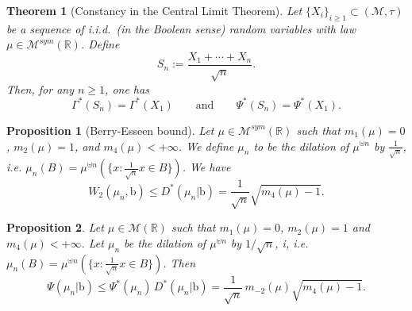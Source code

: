\documentclass[10pt,a4paper]{amsart}
\newtheorem{theorem}{Theorem}
\newtheorem{proposition}{Proposition}
\newcommand{\R}{\mathbb{R}}
\newcommand{\probmsymr}{\mathcal{M}^{sym}(\R)}
\begin{document}
	    \begin{theorem}[Constancy in the Central Limit Theorem]\label{th:constancy}
        Let $\{X_i\}_{i\ge 1}\subset (\mathcal{M},\tau)$ be a sequence of i.i.d.\ (in the Boolean sense) random variables with law $\mu\in\probmsymr $. Define
        \begin{equation*}
            S_n:=\frac{X_1+\cdots+X_n}{\sqrt{n}}.
        \end{equation*}
        Then, for any $n\geq 1$, one has
        \[
        \Gamma^*(S_n)= \Gamma^*(X_1)
        \qquad\text{and}\qquad
        \Psi^*(S_n)= \Psi^*(X_1).
        \]
    \end{theorem}

\begin{proposition}[Berry-Esseen bound]\label{prop:Berryesseen}Let $\mu\in \mathcal{M}^{sym}(\mathbb{R})$ such that $m_1(\mu) = 0$, $m_2(\mu) = 1$,
and $m_4(\mu) < +\infty$.  We define $\mu_n$ to be the dilation of $\mu^{\uplus n}$ by $\frac{1}{\sqrt{n}}$, i.e. $\mu_n(B)=\mu^{\uplus n}(\{x:\frac{1}{\sqrt{n}}x\in B\})$. We have
    $$W_2(\mu_n,\mathbb{\mathrm{b}})\leq D^*(\mu_n|\mathbb{\mathrm{b}})=\frac{1}{\sqrt{n}}\sqrt{m_4(\mu)-1}.$$
\end{proposition}

\begin{proposition}
Let $\mu\in \mathcal{M}(\mathbb{R})$ such that $m_1(\mu)=0$, $m_2(\mu)=1$ and $m_4(\mu)<+\infty$.  
Let $\mu_n$ be the dilation of $\mu^{\uplus n}$ by $1/\sqrt{n}$, i, i.e. $\mu_n(B)=\mu^{\uplus n}(\{x:\frac{1}{\sqrt{n}}x\in B\})$.
Then
\[
\Psi(\mu_n|\mathbb{\mathrm b})
\le \Psi^*(\mu_n)\,D^*(\mu_n|\mathbb{\mathrm b})
=\frac{1}{\sqrt n}\,m_{-2}(\mu)\sqrt{m_4(\mu)-1}.
\]
\end{proposition}
\end{document}
